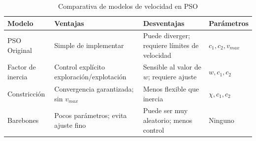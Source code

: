 \begin{table}[H]
  \centering
  \caption{Comparativa de modelos de velocidad en PSO}
  \label{tab:modelos-velocidad}
  \begin{tabularx}{\textwidth}{lXXl}
    \toprule
    \textbf{Modelo} & \textbf{Ventajas} & \textbf{Desventajas} &
    \textbf{Parámetros} \\
    \midrule
    PSO Original &
    Simple de implementar &
    Puede diverger; requiere límites de velocidad &
    $c_1, c_2, v_{max}$ \\
    \addlinespace
    Factor de inercia &
    Control explícito exploración/explotación &
    Sensible al valor de $w$; requiere ajuste &
    $w, c_1, c_2$ \\
    \addlinespace
    Constricción &
    Convergencia garantizada; sin $v_{max}$ &
    Menos flexible que inercia &
    $\chi, c_1, c_2$ \\
    \addlinespace
    Barebones &
    Pocos parámetros; evita ajuste fino &
    Puede ser muy aleatorio; menos control &
    Ninguno \\
    \bottomrule
  \end{tabularx}
\end{table}
